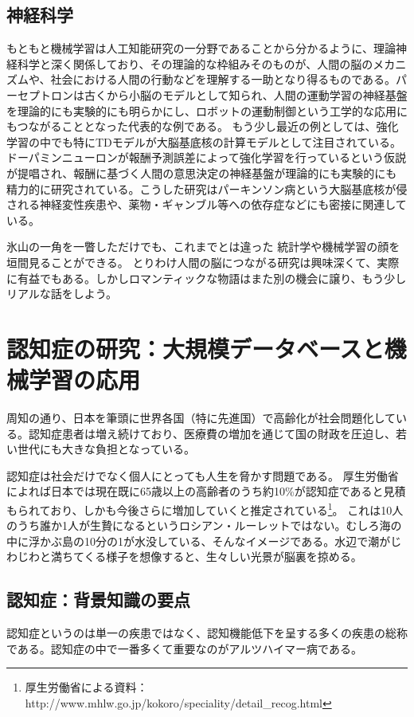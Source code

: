 \subsection{神経科学}
もともと機械学習は人工知能研究の一分野であることから分かるように、理論神経科学と深く関係しており、その理論的な枠組みそのものが、人間の脳のメカニズムや、社会における人間の行動などを理解する一助となり得るものである。パーセプトロンは古くから小脳のモデルとして知られ、人間の運動学習の神経基盤を理論的にも実験的にも明らかにし、ロボットの運動制御という工学的な応用にもつながることとなった代表的な例である。
もう少し最近の例としては、強化学習の中でも特にTDモデルが大脳基底核の計算モデルとして注目されている。ドーパミンニューロンが報酬予測誤差によって強化学習を行っているという仮説が提唱され、報酬に基づく人間の意思決定の神経基盤が理論的にも実験的にも精力的に研究されている。こうした研究はパーキンソン病という大脳基底核が侵される神経変性疾患や、薬物・ギャンブル等への依存症などにも密接に関連している。

氷山の一角を一瞥しただけでも、これまでとは違った
統計学や機械学習の顔を垣間見ることができる。
とりわけ人間の脳につながる研究は興味深くて、実際に有益でもある。しかしロマンティックな物語はまた別の機会に譲り、もう少しリアルな話をしよう。

\section{認知症の研究：大規模データベースと機械学習の応用}
周知の通り、日本を筆頭に世界各国（特に先進国）で高齢化が社会問題化している。認知症患者は増え続けており、医療費の増加を通じて国の財政を圧迫し、若い世代にも大きな負担となっている。

認知症は社会だけでなく個人にとっても人生を脅かす問題である。
厚生労働省によれば日本では現在既に65歳以上の高齢者のうち約10\%が認知症であると見積もられており、しかも今後さらに増加していくと推定されている\footnote{厚生労働省による資料：http://www.mhlw.go.jp/kokoro/speciality/detail\_recog.html
}。
これは10人のうち誰か1人が生贄になるというロシアン・ルーレットではない。むしろ海の中に浮かぶ島の10分の1が水没している、そんなイメージである。水辺で潮がじわじわと満ちてくる様子を想像すると、生々しい光景が脳裏を掠める。

\subsection{認知症：背景知識の要点}
認知症というのは単一の疾患ではなく、認知機能低下を呈する多くの疾患の総称である。認知症の中で一番多くて重要なのがアルツハイマー病である。

